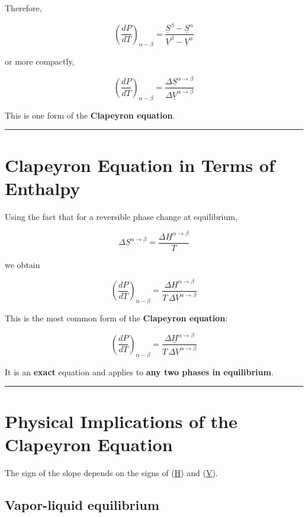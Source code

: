 \documentclass[
  letterpaper,
  DIV=11,
  numbers=noendperiod]{scrartcl}
\begin{document}
Therefore,

\[
\left(\frac{dP}{dT}\right)_{\alpha-\beta}
=
\frac{\underline{S}^\beta - \underline{S}^\alpha}{\underline{V}^\beta - \underline{V}^\alpha}
\]

or more compactly,

\[
\left(\frac{dP}{dT}\right)_{\alpha-\beta}
=
\frac{\Delta \underline{S}^{\alpha\to\beta}}{\Delta \underline{V}^{\alpha\to\beta}}
\]

This is one form of the \textbf{Clapeyron equation}.

\begin{center}\rule{0.5\linewidth}{0.5pt}\end{center}

\section{Clapeyron Equation in Terms of
Enthalpy}\label{clapeyron-equation-in-terms-of-enthalpy}

Using the fact that for a reversible phase change at equilibrium,

\[
\Delta \underline{S}^{\alpha\to\beta}
=
\frac{\Delta \underline{H}^{\alpha\to\beta}}{T}
\]

we obtain

\[
\left(\frac{dP}{dT}\right)_{\alpha-\beta}
=
\frac{\Delta \underline{H}^{\alpha\to\beta}}{T\,\Delta \underline{V}^{\alpha\to\beta}}
\]

This is the most common form of the \textbf{Clapeyron equation}:

\[
\boxed{
\left(\frac{dP}{dT}\right)_{\alpha-\beta}
=
\frac{\Delta \underline{H}^{\alpha\to\beta}}{T\,\Delta \underline{V}^{\alpha\to\beta}}
}
\]

It is an \textbf{exact} equation and applies to \textbf{any two phases
in equilibrium}.

\begin{center}\rule{0.5\linewidth}{0.5pt}\end{center}

\section{Physical Implications of the Clapeyron
Equation}\label{physical-implications-of-the-clapeyron-equation}

The sign of the slope depends on the signs of (\Delta \underline{H}) and
(\Delta \underline{V}).

\subsection{Vapor-liquid equilibrium}\label{vapor-liquid-equilibrium}
\end{document}
